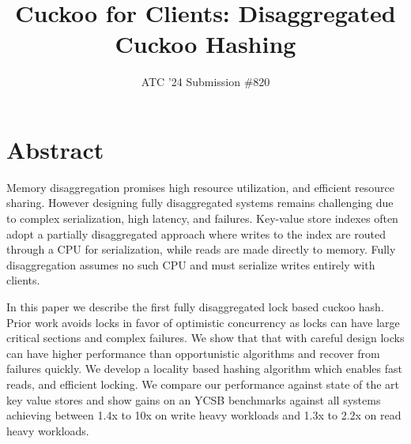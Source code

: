 \documentclass[10pt,twocolumn]{article}
\begin{document}
\title{Cuckoo for Clients: Disaggregated Cuckoo Hashing}
\author{ATC '24 Submission \#820}
\date{}

\maketitle

\section*{Abstract}

Memory disaggregation promises high resource utilization,
and efficient resource sharing. However designing fully
disaggregated systems remains challenging due to complex
serialization, high latency, and failures. Key-value store 
indexes often adopt a partially disaggregated approach
where writes to the index are routed through a CPU for
serialization, while reads are made directly to memory.
Fully disaggregation assumes no such CPU and must serialize
writes entirely with clients.

In this paper we describe the first fully disaggregated
lock based cuckoo hash. Prior work avoids locks in favor of
optimistic concurrency as locks can have large critical
sections and complex failures. We show that that with
careful design locks can have higher performance than
opportunistic algorithms and recover from failures quickly.
We develop a locality based hashing algorithm which enables
fast reads, and efficient locking. We compare our
performance against state of the art key value stores and
show gains on an YCSB benchmarks against all systems
achieving between 1.4x to 10x on write heavy workloads and
1.3x to 2.2x on read heavy workloads.


\end{document}
